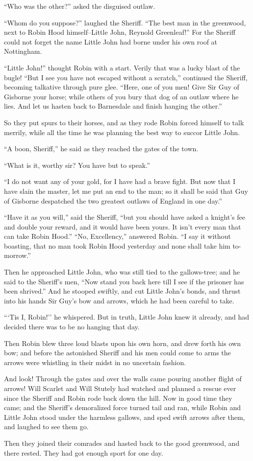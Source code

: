 ``Who was the other?'' asked the disguised outlaw.

``Whom do you suppose?'' laughed the Sheriff. ``The best man in the
greenwood, next to Robin Hood himself--Little John, Reynold Greenleaf!''
For the Sheriff could not forget the name Little John had borne under
his own roof at Nottingham.

``Little John!'' thought Robin with a start. Verily that was a lucky
blast of the bugle! ``But I see you have not escaped without a
scratch,'' continued the Sheriff, becoming talkative through pure glee.
``Here, one of you men! Give Sir Guy of Gisborne your horse; while
others of you bury that dog of an outlaw where he lies. And let us
hasten back to Barnesdale and finish hanging the other.''

So they put spurs to their horses, and as they rode Robin forced himself
to talk merrily, while all the time he was planning the best way to
succor Little John.

``A boon, Sheriff,'' he said as they reached the gates of the town.

``What is it, worthy sir? You have but to speak.''

``I do not want any of your gold, for I have had a brave fight. But now
that I have slain the master, let me put an end to the man; so it shall
be said that Guy of Gisborne despatched the two greatest outlaws of
England in one day.''

``Have it as you will,'' said the Sheriff, ``but you should have asked a
knight's fee and double your reward, and it would have been yours. It
isn't every man that can take Robin Hood.'' ``No, Excellency,'' answered
Robin. ``I say it without boasting, that no man took Robin Hood
yesterday and none shall take him to-morrow.''

Then he approached Little John, who was still tied to the gallows-tree;
and he said to the Sheriff's men, ``Now stand you back here till I see
if the prisoner has been shrived.'' And he stooped swiftly, and cut
Little John's bonds, and thrust into his hands Sir Guy's bow and arrows,
which he had been careful to take.

```Tis I, Robin!'' he whispered. But in truth, Little John knew it
already, and had decided there was to be no hanging that day.

Then Robin blew three loud blasts upon his own horn, and drew forth his
own bow; and before the astonished Sheriff and his men could come to
arms the arrows were whistling in their midst in no uncertain fashion.

And look! Through the gates and over the walls came pouring another
flight of arrows! Will Scarlet and Will Stutely had watched and planned
a rescue ever since the Sheriff and Robin rode back down the hill. Now
in good time they came; and the Sheriff's demoralized force turned tail
and ran, while Robin and Little John stood under the harmless gallows,
and sped swift arrows after them, and laughed to see them go.

Then they joined their comrades and hasted back to the good greenwood,
and there rested. They had got enough sport for one day.
